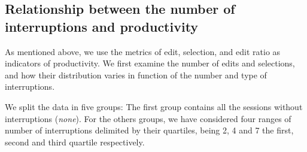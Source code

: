 \subsection{Relationship between the number of interruptions and productivity}
As mentioned above, we use the metrics of edit, selection, and edit ratio as indicators of productivity. We first examine the number of edits and selections, and how their distribution varies in function of the number and type of interruptions.

We split the data in five groups: The first group contains all the sessions without interruptions (\textit{none}). For the others groups, we have considered four ranges of number of interruptions delimited by their quartiles, being 2, 4 and 7 the first, second and third quartile respectively.


